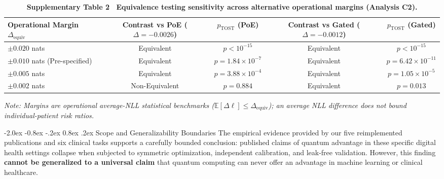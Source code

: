 \documentclass[10pt,a4paper]{article}
\makeatletter
\renewcommand{\subsection}{\@startsection{subsection}{2}{\z@}%
  {-2.0ex \@plus -0.8ex \@minus -.2ex}%
  {0.8ex \@plus.2ex}%
  {\normalfont\large\sffamily\bfseries\color{naturedark}}}
\makeatother
\begin{document}
\begin{table}[h]
\centering
\small
\caption*{\textbf{\textsf{Supplementary Table 2 \textbar\ Equivalence testing sensitivity across alternative operational margins (Analysis C2).}}}
\begin{tabular}{lcccc}
\toprule
\textbf{Operational Margin $\Delta_{\text{equiv}}$} & \textbf{Contrast vs PoE ($\Delta = -0.0026$)} & \textbf{$p_{\text{TOST}}$ (PoE)} & \textbf{Contrast vs Gated ($\Delta = -0.0012$)} & \textbf{$p_{\text{TOST}}$ (Gated)} \\
\midrule
$\pm 0.020$ nats & Equivalent & $p < 10^{-15}$ & Equivalent & $p < 10^{-15}$ \\
$\pm 0.010$ nats (Pre-specified) & Equivalent & $p = 1.84 \times 10^{-7}$ & Equivalent & $p = 6.42 \times 10^{-11}$ \\
$\pm 0.005$ nats & Equivalent & $p = 3.88 \times 10^{-4}$ & Equivalent & $p = 1.05 \times 10^{-5}$ \\
$\pm 0.002$ nats & Non-Equivalent & $p = 0.884$ & Equivalent & $p = 0.013$ \\
\bottomrule
\end{tabular}
\vspace{2pt}
\begin{flushleft}
\footnotesize\textit{Note: Margins are operational average-NLL statistical benchmarks ($\mathbb{E}[\Delta\ell] \le \Delta_{\text{equiv}}$); an average NLL difference does not bound individual-patient risk ratios.}
\end{flushleft}
\end{table}

\subsection{Scope and Generalizability Boundaries}
The empirical evidence provided by our five reimplemented publications and six clinical tasks supports a carefully bounded conclusion: published claims of quantum advantage in these specific digital health settings collapse when subjected to symmetric optimization, independent calibration, and leak-free validation. However, this finding \textbf{cannot be generalized to a universal claim} that quantum computing can never offer an advantage in machine learning or clinical healthcare. 
\end{document}
